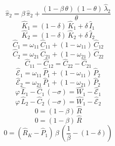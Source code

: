 \begin{dmath}
{{\hat{\pi}_{2}}}={{\beta}}\, {{\hat{\pi}_{2}}}+\frac{\left(1-{{\beta}}\, {{\theta}}\right)\, \left(1-{{\theta}}\right)\, {{\hat{\lambda}_{2}}}}{{{\theta}}}
\end{dmath}
\begin{dmath}
{{\hat{K}_{1}}}=\left(1-{{\delta}}\right)\, {{\hat{K}_{1}}}+{{\delta}}\, {{\hat{I}_{1}}}
\end{dmath}
\begin{dmath}
{{\hat{K}_{2}}}=\left(1-{{\delta}}\right)\, {{\hat{K}_{2}}}+{{\delta}}\, {{\hat{I}_{2}}}
\end{dmath}
\begin{dmath}
{{\hat{C}_{1}}}={{\omega_{11}}}\, {{\hat{C}_{1 1}}}+\left(1-{{\omega_{11}}}\right)\, {{\hat{C}_{1 2}}}
\end{dmath}
\begin{dmath}
{{\hat{C}_{2}}}={{\omega_{21}}}\, {{\hat{C}_{2 1}}}+\left(1-{{\omega_{21}}}\right)\, {{\hat{C}_{2 2}}}
\end{dmath}
\begin{dmath}
{{\hat{C}_{1 1}}}-{{\hat{C}_{1 2}}}={{\hat{C}_{2 2}}}-{{\hat{C}_{2 1}}}
\end{dmath}
\begin{dmath}
{{\hat{\mathscr{E}}_{1}}}={{\omega_{11}}}\, {{\hat{P}_{1}}}+\left(1-{{\omega_{11}}}\right)\, {{\hat{P}_{2}}}
\end{dmath}
\begin{dmath}
{{\hat{\mathscr{E}}_{2}}}={{\omega_{21}}}\, {{\hat{P}_{1}}}+\left(1-{{\omega_{21}}}\right)\, {{\hat{P}_{2}}}
\end{dmath}
\begin{dmath}
{{\varphi}}\, {{\hat{L}_{1}}}-{{\hat{C}_{1}}}\, \left(-{{\sigma}}\right)={{\hat{W}_{1}}}-{{\hat{\mathscr{E}}_{1}}}
\end{dmath}
\begin{dmath}
{{\varphi}}\, {{\hat{L}_{2}}}-{{\hat{C}_{2}}}\, \left(-{{\sigma}}\right)={{\hat{W}_{1}}}-{{\hat{\mathscr{E}}_{2}}}
\end{dmath}
\begin{dmath}
0=\left(1-{{\beta}}\right)\, {{\hat{R}}}
\end{dmath}
\begin{dmath}
0=\left(1-{{\beta}}\right)\, {{\hat{R}}}
\end{dmath}
\begin{dmath}
0=\left({{\hat{R}_{K}}}-{{\hat{P}_{1}}}\right)\, {{\beta}}\, \left(\frac{1}{{{\beta}}}-\left(1-{{\delta}}\right)\right)
\end{dmath}
